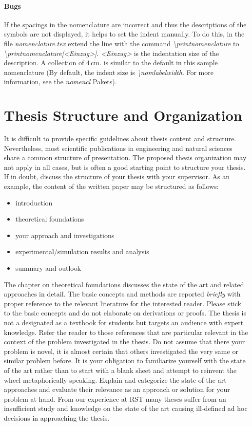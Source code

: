 \paragraph{Bugs}

If the spacings in the nomenclature are incorrect and thus the descriptions of the symbols are not displayed, it helps to set the indent manually.
To do this, in the file \textit{nomenclature.tex} extend the line with the command \textit{\textbackslash printnomenclature} to \textit{\textbackslash printnomenclature[<Einzug>]}.
\textit{<Einzug>} is the indentation size of the description.
A collection of $4\,\mathrm{cm}$. is similar to the default in this sample nomenclature (By default, the indent size is \textit{\textbackslash nomlabelwidth}.
For more information, see the \textit{nomencl} Pakets).

\section{Thesis Structure and Organization}
\label{hinweise:struktur}

It is difficult to provide specific guidelines about thesis content and structure.
Nevertheless, most scientific publications in engineering and
natural sciences share a common structure of presentation.
The proposed thesis organization may not apply in all cases, but is often a good
starting point to structure your thesis.
If in doubt, discuss the structure of your thesis with your supervisor.
As an example, the content of the written paper may be structured as follows:

\begin{itemize}
	\item introduction
	\item theoretical foundations
	\item your approach and investigations
	\item experimental/simulation results and analysis
	\item summary and outlook
\end{itemize}

The chapter on theoretical foundations discusses the state of the art and related approaches in detail.
The basic concepts and methods are reported \emph{briefly} with proper reference to the relevant literature for the interested reader.
Please stick to the basic concepts and do not elaborate on derivations or proofs. The thesis is not a designated as a textbook for students but targets an audience with expert knowledge.
Refer the reader to those references that are particular relevant in the context of the problem investigated in the thesis. Do not assume that there your problem is novel, it is almost certain that others investigated the very same or similar problem before.
It is your obligation to familiarize yourself with the state of the art rather
than to start with a blank sheet and attempt to reinvent the wheel metaphorically speaking.
Explain and categorize the state of the art approaches and evaluate their relevance
as an approach or solution for your problem at hand.
From our experience at RST many theses suffer from an insufficient study and knowledge
on the state of the art causing ill-defined ad hoc decisions in
approaching the thesis.

